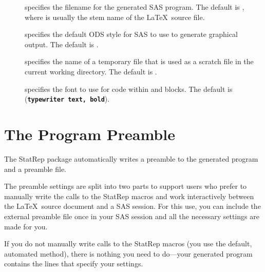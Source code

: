 \documentclass[article,oneside]{memoir}
\newcommand*{\StatRep}{\textsf{StatRep}\xspace}
\begin{document}
\begin{description}
      \item[] specifies the filename for the generated SAS
     program. The default is , where  is
     usually the stem name of the \LaTeX\ source file.


    \item[] specifies the default ODS style for SAS to use to generate
    graphical output. The default is .

     \item[] specifies the name of a temporary file
     that is used as a scratch file in the current working directory.
     The default is .

     \item[] specifies the font to use for code within  and
      blocks. The default is 
     (\texttt{\textbf{typewriter text, bold}}).

     \end{description}

  \section{The Program Preamble}

The \StatRep package automatically writes a preamble to the generated program and a preamble file.

The preamble settings are split into two parts to support users who prefer to
manually write the calls to the \StatRep macros and work interactively between the
\LaTeX\ source document and a SAS session.  For this use, you can include the external
preamble file once in your SAS session and all the necessary settings are made for you.

If you do not manually write calls to the \StatRep macros (you use the default, automated method),
there is nothing you need to do---your generated program contains the lines that specify your settings.
\end{document}
